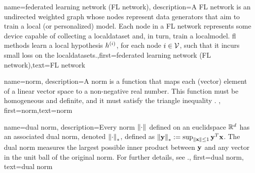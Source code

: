 {name={federated learning network (FL network)},
	description={A FL network is an 
		undirected weighted \gls{graph} whose nodes represent \gls{data} generators that 
		aim to train a local (or personalized) \gls{model}. Each node in a FL network 
		represents some \gls{device} capable of collecting a \gls{localdataset} 
		and, in turn, train a \gls{localmodel}. \Gls{fl} methods learn a local \gls{hypothesis} $h^{(i)}$, for 
	    each node $i \in \mathcal{V}$, such that it incurs small \gls{loss} on the \gls{localdataset}s.},first={federated learning network (FL network)},text={FL network} 
}

{name={norm},
	description={A norm is a function that maps each (vector) element 
		of a linear vector space to a non-negative real number. This function must be 
		homogeneous and definite, and it must satisfy the triangle inequality \cite{HornMatAnalysis}. },
	first={norm},text={norm} 
}

{name={dual norm},
description={Every \gls{norm} $\left\Vert {\cdot} \right\Vert_{}$ defined on an \gls{euclidspace} $\mathbb{R}^{d}$ 
		has an associated dual \gls{norm}, denoted $\left\Vert {\cdot} \right\Vert_{*}$, defined as 
		$\left\Vert {{\bf y}} \right\Vert_{*} := \sup_{\Vert {{\bf x}} \Vert{} \le 1} {\bf y}^{T} {\bf x}$. 
		The dual \gls{norm} measures the largest possible inner product between ${\bf y}$ 
		and any vector in the unit ball of the original \gls{norm}. For further details, see 
		\cite[Sec.~A.1.6 ]{BoydConvexBook}.},
	first={dual norm},
	text={dual norm}
}


